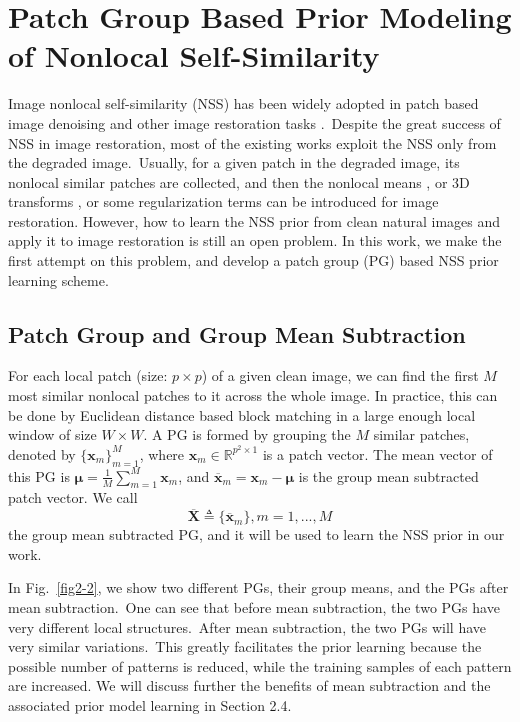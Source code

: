 \section{Patch Group Based Prior Modeling of Nonlocal Self-Similarity}
Image nonlocal self-similarity (NSS) has been widely adopted in patch based image denoising and other image restoration tasks \cite{nlm,bm3d,lssc,ncsr,wnnm}.\ Despite the great success of NSS in image restoration, most of the existing works exploit the NSS only from the degraded image.\ Usually, for a given patch in the degraded image, its nonlocal similar patches are collected, and then the nonlocal means \cite{nlm}, or 3D transforms \cite{bm3d}, or some regularization terms \cite{lssc,ncsr,wnnm,srcolor} can be introduced for image restoration. However, how to learn the NSS prior from clean natural images and apply it to image restoration is still an open problem. In this work, we make the first attempt on this problem, and develop a patch group (PG) based NSS prior learning scheme.  
\subsection{Patch Group and Group Mean Subtraction}
For each local patch (size: $p\times p$) of a given clean image, we can find the first $M$ most similar nonlocal patches to it across the whole image. In practice, this can be done by Euclidean distance based block matching in a large enough local window of size $W\times W$. A PG is formed by grouping the $M$ similar patches, denoted by $\{\bm{x}_{m}\}_{m=1}^{M}$, where $\bm{x}_{m}\in \mathbb{R}^{p^{2}\times1}$ is a patch vector. The mean vector of this PG is $\bm{\mu}=\frac{1}{M}\sum_{m=1}^{M}\bm{x}_{m}$, and $\bm{\overline{x}}_{m}=\bm{x}_{m}-\bm{\mu}$ is the group mean subtracted patch vector. We call
\begin{equation}
\label{equ2-1}
\overline{\bm{X}}\triangleq \{\overline{\bm{x}}_{m}\}, m=1,...,M
\end{equation}
the group mean subtracted PG, and it will be used to learn the NSS prior in our work. 

In Fig.\ \ref{fig2-2}, we show two different PGs, their group means, and the PGs after mean subtraction.\ One can see that before mean subtraction, the two PGs have very different local structures.\ After mean subtraction, the two PGs will have very similar variations.\ This greatly facilitates the prior learning because the possible number of patterns is reduced, while the training samples of each pattern are increased. We will discuss further the benefits of mean subtraction and the associated prior model learning in Section 2.4.   

